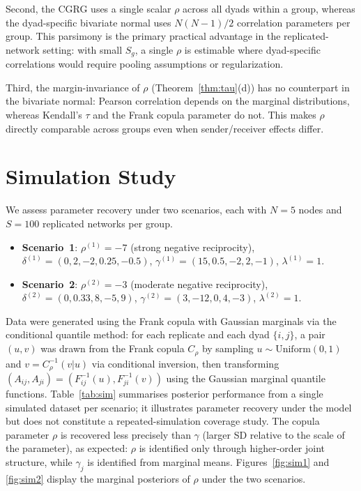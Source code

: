 \documentclass[12pt]{article}
\begin{document}
Second, the CGRG uses a single scalar $\rho$ across all dyads within a group,
whereas the dyad-specific bivariate normal uses $N(N-1)/2$ correlation
parameters per group.  This parsimony is the primary practical advantage in
the replicated-network setting: with small $S_g$, a single $\rho$ is
estimable where dyad-specific correlations would require pooling assumptions
or regularization.

Third, the margin-invariance of $\rho$ (Theorem~\ref{thm:tau}(d)) has no
counterpart in the bivariate normal: Pearson correlation depends on the marginal
distributions, whereas Kendall's $\tau$ and the Frank copula parameter do not.
This makes $\rho$ directly comparable across groups even when sender/receiver
effects differ.

\section{Simulation Study}
\label{sec:sim}

We assess parameter recovery under two scenarios, each with $N = 5$ nodes and
$S = 100$ replicated networks per group.

\begin{itemize}
\item \textbf{Scenario~1}: $\rho^{(1)} = -7$ (strong negative reciprocity),
  $\delta^{(1)} = (0, 2, -2, 0.25, -0.5)$,
  $\gamma^{(1)} = (15, 0.5, -2, 2, -1)$, $\lambda^{(1)} = 1$.
\item \textbf{Scenario~2}: $\rho^{(2)} = -3$ (moderate negative reciprocity),
  $\delta^{(2)} = (0, 0.33, 8, -5, 9)$,
  $\gamma^{(2)} = (3, -12, 0, 4, -3)$, $\lambda^{(2)} = 1$.
\end{itemize}

Data were generated using the Frank copula with Gaussian marginals via the
conditional quantile method: for each replicate and each dyad $\{i,j\}$,
a pair $(u,v)$ was drawn from the Frank copula $C_\rho$ by sampling $u \sim
\mathrm{Uniform}(0,1)$ and $v = C_\rho^{-1}(v|u)$ via conditional inversion,
then transforming $(A_{ij}, A_{ji}) = (F_{ij}^{-1}(u), F_{ji}^{-1}(v))$ using
the Gaussian marginal quantile functions.  Table~\ref{tab:sim} summarises
posterior performance from a single simulated dataset per scenario; it
illustrates parameter recovery under the model but does not constitute a
repeated-simulation coverage study.  The copula parameter $\rho$ is recovered
less precisely than $\gamma$ (larger SD relative to the scale of the
parameter), as expected: $\rho$ is identified only through higher-order joint
structure, while $\gamma_j$ is identified from marginal means.
Figures~\ref{fig:sim1} and \ref{fig:sim2} display the marginal posteriors of
$\rho$ under the two scenarios.
\end{document}

